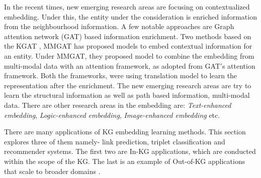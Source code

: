 In the recent times, new emerging research areas are focusing on contextualized embedding. Under this, the entity under the consideration is enriched information from the neighbourhood information. A few notable approaches are Graph attention network (GAT)  based information enrichment. Two methods based on the KGAT , MMGAT  has proposed models to embed contextual information for an entity. Under MMGAT, they proposed model to combine the embedding from multi-modal data with an attention framework, as adopted from GAT's attention framework. Both the frameworks, were using translation model to learn the representation after the enrichment. The new emerging research areas are try to learn the structural information as well as path based information, multi-modal data. There are other research areas in the embedding are: \textit{Text-enhanced embedding}, \textit{Logic-enhanced embedding}, \textit{Image-enhanced embedding}  etc.

There are many applications of KG embedding learning methods. This section explores three of them namely- link prediction, triplet classification and recommender systems. 
\noindent
The first two are In-KG applications, which are conducted within the scope of the KG. The last is an example of Out-of-KG applications that scale to broader domains .

